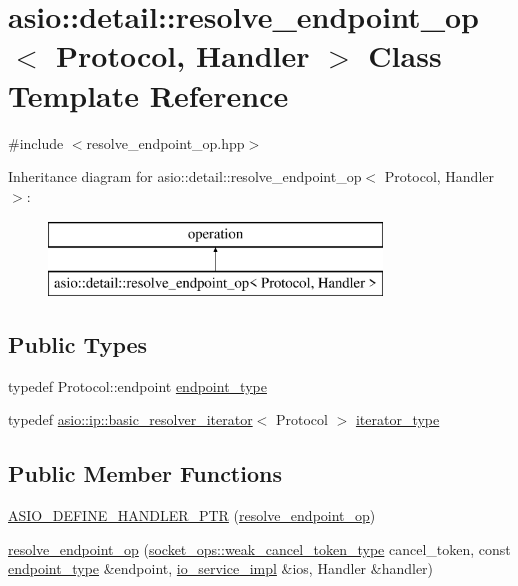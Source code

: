 \hypertarget{classasio_1_1detail_1_1resolve__endpoint__op}{}\section{asio\+:\+:detail\+:\+:resolve\+\_\+endpoint\+\_\+op$<$ Protocol, Handler $>$ Class Template Reference}
\label{classasio_1_1detail_1_1resolve__endpoint__op}


{\ttfamily \#include $<$resolve\+\_\+endpoint\+\_\+op.\+hpp$>$}

Inheritance diagram for asio\+:\+:detail\+:\+:resolve\+\_\+endpoint\+\_\+op$<$ Protocol, Handler $>$\+:\begin{figure}[H]
\begin{center}
\leavevmode
\includegraphics[height=2.000000cm]{classasio_1_1detail_1_1resolve__endpoint__op}
\end{center}
\end{figure}
\subsection*{Public Types}
\begin{DoxyCompactItemize}
\item 
typedef Protocol\+::endpoint \hyperlink{classasio_1_1detail_1_1resolve__endpoint__op_ac3d7acefa9c9de9b1a9c159b5406a3ed}{endpoint\+\_\+type}
\item 
typedef \hyperlink{classasio_1_1ip_1_1basic__resolver__iterator}{asio\+::ip\+::basic\+\_\+resolver\+\_\+iterator}$<$ Protocol $>$ \hyperlink{classasio_1_1detail_1_1resolve__endpoint__op_ad3f31906ec6e628f8da89b193059452c}{iterator\+\_\+type}
\end{DoxyCompactItemize}
\subsection*{Public Member Functions}
\begin{DoxyCompactItemize}
\item 
\hyperlink{classasio_1_1detail_1_1resolve__endpoint__op_a6cc409feb6a0a9f52105c8cb1652ab62}{A\+S\+I\+O\+\_\+\+D\+E\+F\+I\+N\+E\+\_\+\+H\+A\+N\+D\+L\+E\+R\+\_\+\+P\+T\+R} (\hyperlink{classasio_1_1detail_1_1resolve__endpoint__op}{resolve\+\_\+endpoint\+\_\+op})
\item 
\hyperlink{classasio_1_1detail_1_1resolve__endpoint__op_af1f0749393d4be3e943c45f301ceaecb}{resolve\+\_\+endpoint\+\_\+op} (\hyperlink{namespaceasio_1_1detail_1_1socket__ops_a9dbe5bfa22a69dc9a583a8060228860f}{socket\+\_\+ops\+::weak\+\_\+cancel\+\_\+token\+\_\+type} cancel\+\_\+token, const \hyperlink{classasio_1_1detail_1_1resolve__endpoint__op_ac3d7acefa9c9de9b1a9c159b5406a3ed}{endpoint\+\_\+type} \&endpoint, \hyperlink{namespaceasio_1_1detail_a6d61d9b8e53c11288be549d82aec5a42}{io\+\_\+service\+\_\+impl} \&ios, Handler \&handler)
\end{DoxyCompactItemize}
